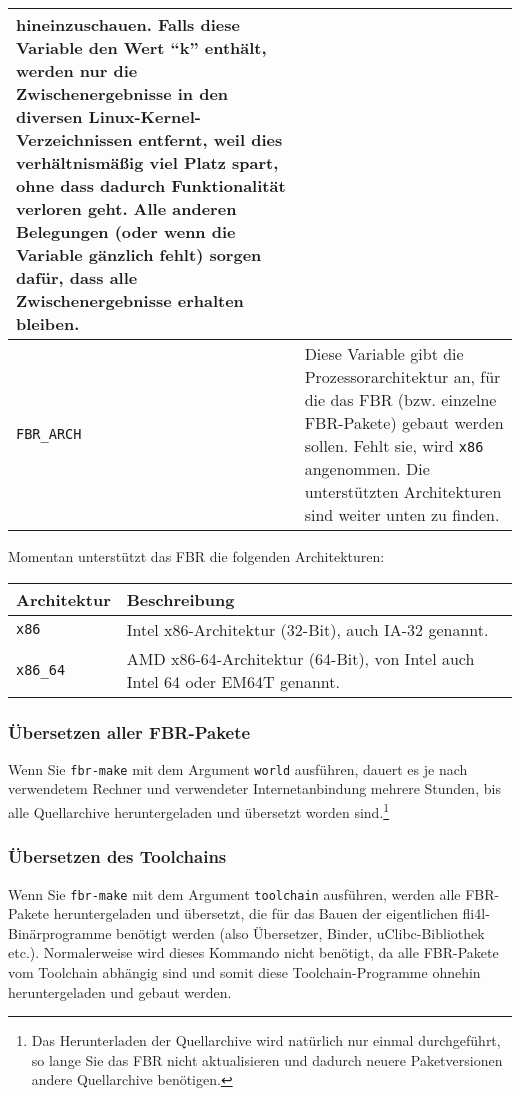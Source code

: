 \begin{longtable}{|l|p{10cm}|}
    hineinzuschauen. Falls diese Variable den Wert ``k'' enthält, werden nur
    die Zwischenergebnisse in den diversen Linux-Kernel-Verzeichnissen entfernt,
    weil dies verhältnismäßig viel Platz spart, ohne dass dadurch Funktionalität
    verloren geht. Alle anderen Belegungen (oder wenn die Variable gänzlich
    fehlt) sorgen dafür, dass alle Zwischenergebnisse erhalten bleiben.\\
\hline
\texttt{FBR\_ARCH} &
    Diese Variable gibt die Prozessorarchitektur an, für die das FBR (bzw.
    einzelne FBR-Pakete) gebaut werden sollen. Fehlt sie, wird \texttt{x86}
    angenommen. Die unterstützten Architekturen sind weiter unten zu finden.\\
\hline
\end{longtable}

Momentan unterstützt das FBR die folgenden Architekturen:

\begin{longtable}{|l|p{10cm}|}
    \hline
    \multicolumn{1}{|l}{\textbf{Architektur}} &
    \multicolumn{1}{|l|}{\textbf{Beschreibung}} \\
    \hline
    \endhead
    \hline
    \endfoot
    \endlastfoot
\texttt{x86} &
    Intel x86-Architektur (32-Bit), auch IA-32 genannt. \\
\hline
\texttt{x86\_64} &
    AMD x86-64-Architektur (64-Bit), von Intel auch Intel 64 oder EM64T genannt. \\
\hline
\end{longtable}

\subsubsection{Übersetzen aller FBR-Pakete}

Wenn Sie \texttt{fbr-make} mit dem Argument \texttt{world} ausführen,
dauert es je nach verwendetem Rechner und verwendeter Internetanbindung
mehrere Stunden, bis alle Quellarchive heruntergeladen und übersetzt worden
sind.\footnote{Das Herunterladen der Quellarchive wird natürlich nur einmal
durchgeführt, so lange Sie das FBR nicht aktualisieren und dadurch neuere
Paketversionen andere Quellarchive benötigen.}

\subsubsection{Übersetzen des Toolchains}

Wenn Sie \texttt{fbr-make} mit dem Argument \texttt{toolchain} ausführen,
werden alle FBR-Pakete heruntergeladen und übersetzt, die für das Bauen der
eigentlichen fli4l-Binärprogramme benötigt werden (also Übersetzer, Binder,
uClibc-Bibliothek etc.). Normalerweise wird dieses Kommando nicht benötigt,
da alle FBR-Pakete vom Toolchain abhängig sind und somit diese
Toolchain-Programme ohnehin heruntergeladen und gebaut werden.

